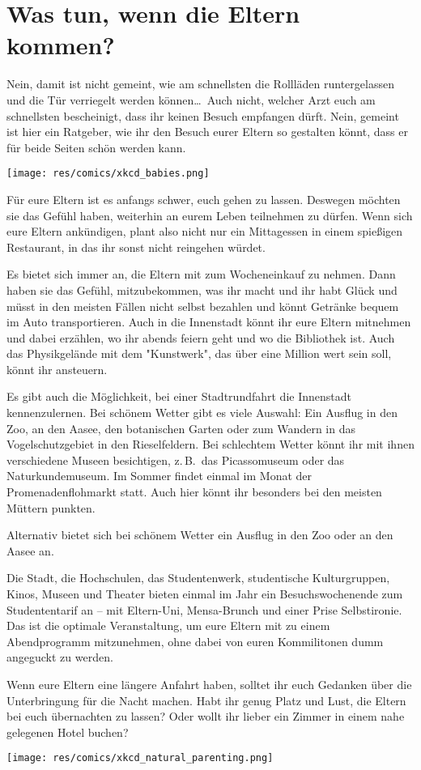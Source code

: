
\section{Was tun, wenn die Eltern kommen?}
\begin{multicols}{2}
Nein, damit ist nicht gemeint, wie am schnellsten die Rollläden runtergelassen und die Tür verriegelt werden können\dots\ Auch nicht, welcher Arzt euch am schnellsten bescheinigt, dass ihr keinen Besuch empfangen dürft. Nein, gemeint ist hier ein Ratgeber, wie ihr den Besuch eurer Eltern so gestalten könnt, dass er für beide Seiten schön werden kann.

\begin{center}
\texttt{[image: res/comics/xkcd\_babies.png]}
\end{center}

Für eure Eltern ist es anfangs schwer, euch gehen zu lassen. Deswegen möchten sie das Gefühl haben, weiterhin an eurem Leben teilnehmen zu dürfen. Wenn sich eure Eltern ankündigen, plant also nicht nur ein Mittagessen in einem spießigen Restaurant, in das ihr sonst nicht reingehen würdet.

Es bietet sich immer an, die Eltern mit zum Wocheneinkauf zu nehmen. Dann haben sie das Gefühl, mitzubekommen, was ihr macht und ihr habt Glück und müsst in den meisten Fällen nicht selbst bezahlen und könnt Getränke bequem im Auto transportieren. Auch in die Innenstadt könnt ihr eure Eltern mitnehmen und dabei erzählen, wo ihr abends feiern geht und wo die Bibliothek ist. Auch das Physikgelände mit dem "Kunstwerk", das über eine Million wert sein soll, könnt ihr ansteuern.

Es gibt auch die Möglichkeit, bei einer Stadtrundfahrt die Innenstadt kennenzulernen. Bei schönem Wetter gibt es viele Auswahl: Ein Ausflug in den Zoo, an den Aasee, den botanischen Garten oder zum Wandern in das Vogelschutzgebiet in den Rieselfeldern. Bei schlechtem Wetter könnt ihr mit ihnen verschiedene Museen besichtigen, z.\,B.\ das Picassomuseum oder das Naturkundemuseum. Im Sommer findet einmal im Monat der Promenadenflohmarkt statt. Auch hier könnt ihr besonders bei den meisten Müttern punkten.

Alternativ bietet sich bei schönem Wetter ein Ausflug in den Zoo oder an den Aasee an.

Die Stadt, die Hochschulen, das Studentenwerk, studentische Kulturgruppen, Kinos, Museen und Theater bieten einmal im Jahr ein Besuchswochenende zum Studententarif an -- mit Eltern-Uni, Mensa-Brunch und einer Prise Selbstironie. Das ist die optimale Veranstaltung, um eure Eltern mit zu einem Abendprogramm mitzunehmen, ohne dabei von euren Kommilitonen dumm angeguckt zu werden.

Wenn eure Eltern eine längere Anfahrt haben, solltet ihr euch Gedanken über die Unterbringung für die Nacht machen. Habt ihr genug Platz und Lust, die Eltern bei euch übernachten zu lassen? Oder wollt ihr lieber ein Zimmer in einem nahe gelegenen Hotel buchen?

\end{multicols}

\medskip
\begin{center}
\texttt{[image: res/comics/xkcd\_natural\_parenting.png]}
\end{center}

